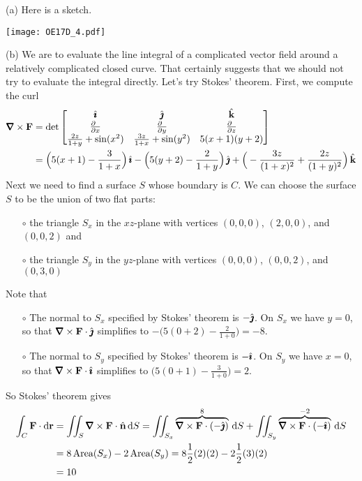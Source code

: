 \begin{solution} (a) Here is a sketch.

\begin{center}
     \texttt{[image: OE17D\_4.pdf]}
\end{center}

(b) We are to evaluate the line integral of a complicated vector field
around a relatively complicated closed curve. That certainly suggests that
we should not try to evaluate the integral directly. Let's try
Stokes' theorem. First, we compute the curl
\begin{align*}
\vnabla\times\vF
&=\det\left[\begin{matrix}
\hi &\hj &\hk \\
\tfrac{\partial\hfill}{\partial x} & \tfrac{\partial\hfill}{\partial y} & 
                \tfrac{\partial\hfill}{\partial z} \\
       \frac{2z}{1+y}+\sin(x^2) & \frac{3z}{1+x}+\sin(y^2) & 5(x+1)(y+2)
       \end{matrix} \right] \\
&= \Big(5(x+1)-\frac{3}{1+x}\Big)\,\hi
  -\Big(5(y+2)-\frac{2}{1+y}\Big)\,\hj 
  +\Big(-\frac{3z}{(1+x)^2}+\frac{2z}{(1+y)^2}\Big)\,\hk
\end{align*}
Next we need to find a surface $S$ whose boundary is $C$.
We can choose the surface $S$ to be the union of two flat parts:
\begin{itemize}\itemsep1pt \parskip0pt  %
\item[$\circ$]
the triangle $S_x$ in the $xz$-plane with vertices $(0,0,0)$,
$(2,0,0)$, and $(0,0,2)$ and
\item[$\circ$]
the triangle $S_y$ in the $yz$-plane with vertices $(0,0,0)$,
$(0,0,2)$, and $(0,3,0)$
\end{itemize} 
Note that
\begin{itemize}\itemsep1pt \parskip0pt  %
\item[$\circ$]
The normal to $S_x$ specified by Stokes' theorem is $-\hat{\pmb{\jmath}}$. On $S_x$
we have $y=0$, so that $\vnabla\times\vF\cdot\hj$ simplifies to 
$-\big(5(0+2)-\frac{2}{1+0}\big)=-8$.
\item[$\circ$]
The normal to $S_y$ specified by Stokes' theorem is $-\hat{\pmb{\imath}}$. On $S_y$
we have $x=0$, so that $\vnabla\times\vF\cdot\hi$ simplifies to 
$\big(5(0+1)-\frac{3}{1+0}\big)=2$.
\end{itemize} 
So Stokes' theorem gives
\begin{align*}
\int_C\vF\cdot\dee{\vr}
&=\dblInt_S  \vnabla\times\vF\cdot\hn\,\dee{S} 
=\dblInt_{S_x}  \overbrace{\vnabla\times\vF\cdot(-\hj)}^{8}\,\dee{S} 
  + \dblInt_{S_y}  \overbrace{\vnabla\times\vF\cdot(-\hi)}^{-2}\,\dee{S} \\
&=8\,\text{Area}(S_x)  -2\,\text{Area}(S_y)
  =8\frac{1}{2}(2)(2) -2\frac{1}{2}(3)(2) \\
&=10
\end{align*}
\end{solution}

